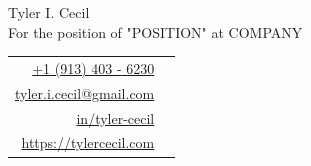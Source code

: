 \documentclass[sans, a4paper, 11pt]{article}
\newcommand{\cvcolor}[1]{{\color{MidnightBlue}#1}}
\begin{document}
\noindent
\begin{minipage}{0.675\linewidth}
  {
    \fontsize{40pt}{50pt}\selectfont
    \noindent
    Tyler I. Cecil
  }\\
  {\Large \color{darkgray}
    {
      \fontsize{16pt}{20pt}\selectfont
      \noindent
      For the position of "POSITION" at COMPANY
    }
  }
\end{minipage}
\hfill
{
  \fontsize{10pt}{13pt}\selectfont
  \begin{tabular}{|rl}
    \href{tel:+1 (913) 403 - 6230}{+1 (913) 403 - 6230}&\cvcolor{\faPhone} \\
    \href{mailto:tyler.i.cecil@gmail.com}{tyler.i.cecil@gmail.com}&\cvcolor{\faEnvelope} \\
    \href{https://www.linkedin.com/in/tyler-cecil/}{in/tyler-cecil}&\cvcolor{\faLinkedinSquare} \\
    \href{https://tylercecil.com}{https://tylercecil.com}&\cvcolor{\faGlobe} \\
  \end{tabular}
  }

\vspace{0.5em}
\noindent\hrulefill
\vspace{1em}
\end{document}
